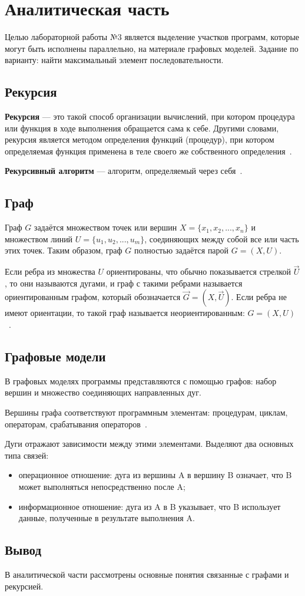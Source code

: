 \chapter{Аналитическая часть}
Целью лабораторной работы №3 является выделение участков программ, которые могут быть исполнены параллельно, на материале графовых моделей. Задание по варианту: найти максимальный элемент последовательности.

\section{Рекурсия}
\textbf{Рекурсия} --- это такой способ организации вычислений, при котором процедура или функция в ходе выполнения обращается сама к себе. Другими словами, рекурсия является методом определения функций (процедур), при котором определяемая функция применена в теле своего же собственного определения~\cite{lit1}.

\textbf{Рекурсивный алгоритм} --- алгоритм, определяемый через себя~\cite{lit2}.

\section{Граф}
Граф $G$ задаётся множеством точек или вершин $X=\{x_1, x_2, ..., x_n\}$ и
множеством линий $U=\{u_1, u_2, ..., u_m\}$, соединяющих между собой все или
часть этих точек. Таким образом, граф $G$ полностью задаётся парой $G=(X, U)$.

Если ребра из множества $U$ ориентированы, что обычно показывается
стрелкой $\vec{U}$,
то они называются дугами, и граф с такими ребрами
называется ориентированным графом, который обозначается $\vec{G} = (X,\vec{U})$. Если ребра не имеют ориентации, то такой граф называется неориентированным: $G=(X, U)$~\cite{lit3}.

\section{Графовые модели}
В графовых моделях программы представляются с помощью графов: набор вершин и множество соединяющих направленных дуг.

Вершины графа соответствуют программным элементам: процедурам, циклам, операторам, срабатывания операторов~\cite{lit4}.

Дуги отражают зависимости между этими элементами. Выделяют два основных типа связей:
\begin{itemize}
\item операционное отношение: дуга из вершины A в вершину B означает, что B может выполняться непосредственно после A;
\item информационное отношение: дуга из A в B указывает, что B использует данные, полученные в результате выполнения A.
\end{itemize}

 \section*{Вывод}
В аналитической части рассмотрены основные понятия связанные с графами и рекурсией.
\clearpage
